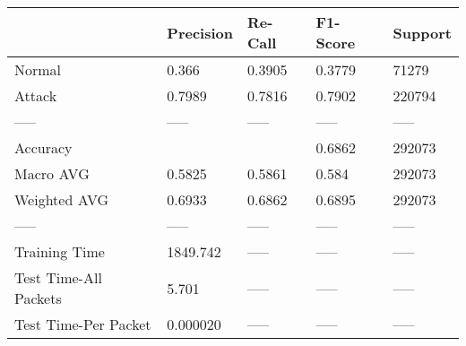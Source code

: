 \begin{tabular}{lllll}
\toprule
{} & Precision & Re-Call & F1-Score & Support \\
\midrule
Normal                &     0.366 &  0.3905 &   0.3779 &   71279 \\
Attack                &    0.7989 &  0.7816 &   0.7902 &  220794 \\
-----                 &     ----- &   ----- &    ----- &   ----- \\
Accuracy              &           &         &   0.6862 &  292073 \\
Macro AVG             &    0.5825 &  0.5861 &    0.584 &  292073 \\
Weighted AVG          &    0.6933 &  0.6862 &   0.6895 &  292073 \\
-----                 &     ----- &   ----- &    ----- &   ----- \\
Training Time         &  1849.742 &   ----- &    ----- &   ----- \\
Test Time-All Packets &     5.701 &   ----- &    ----- &   ----- \\
Test Time-Per Packet  &  0.000020 &   ----- &    ----- &   ----- \\
\bottomrule
\end{tabular}
